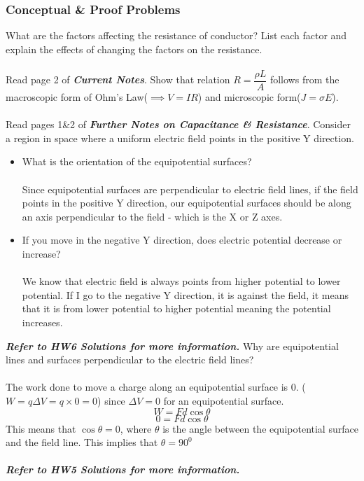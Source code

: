 \documentclass[11pt,addpoints]{exam}
\begin{document}
{{{\begin{questions}
					\subsubsection*{Conceptual \& Proof Problems}
					\question What are the factors affecting the resistance of conductor? List each factor and explain the effects of changing the factors on the resistance. \\ \\
					Read page 2 of \textbf{\textit{Current Notes}}.
					\question Show that relation $R=\dfrac{\rho L}{A}$ follows from the macroscopic form of Ohm's Law($\implies V=IR$) and microscopic form($J=\sigma E$). \\ \\
					Read pages 1\&2 of \textbf{\textit{Further Notes on Capacitance \& Resistance}}.
					\question Consider a region in space where a uniform electric field points in the positive Y direction. \begin{itemize}
						\item What is the orientation of the equipotential surfaces?\\ \\
						Since equipotential surfaces are perpendicular to electric field lines, if the field points in the positive Y direction, our equipotential surfaces should be along an axis perpendicular to the field - which is the X or Z axes.
						\item If you move in the negative Y direction, does electric potential decrease or increase?\\ \\
						We know that electric field is always points from higher potential to lower potential. If I go to the negative Y direction, it is against the field, it means that it is from lower potential to higher potential meaning the potential increases.
					\end{itemize}
					\textit{\textbf{Refer to HW6 Solutions for more information.}}
					\question Why are equipotential lines and surfaces perpendicular to the electric field lines? \\ \\
					The work done to move a charge along an equipotential surface is 0. ($W=q\Delta V=q\times0=0$) since $\Delta V=0$ for an equipotential surface.
					$$W=Fd\cos\theta$$
					$$0=Fd\cos\theta$$
					This means that $\cos\theta=0$, where $\theta$ is the angle between the equipotential surface and the field line. This implies that $\theta=90^0$ \\ \\
					\textbf{\textit{Refer to HW5 Solutions for more information.}}

\end{questions}}}}
\end{document}
